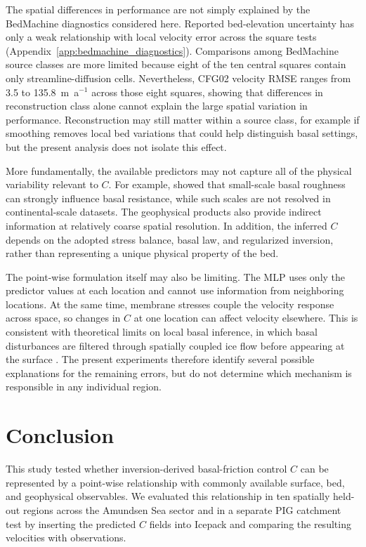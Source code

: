\documentclass[review,jog]{igs}
\begin{document}
The spatial differences in performance are not simply explained by the
BedMachine diagnostics considered here. Reported bed-elevation uncertainty has
only a weak relationship with local velocity error across the square tests
(Appendix~\ref{app:bedmachine_diagnostics}). Comparisons among BedMachine
source classes are more limited because eight of the ten central squares
contain only streamline-diffusion cells. Nevertheless, CFG02 velocity RMSE
ranges from 3.5 to 135.8~m~a$^{-1}$ across those eight squares, showing that
differences in reconstruction class alone cannot explain the large spatial
variation in performance. Reconstruction may still matter within a source
class, for example if smoothing removes local bed variations that could help
distinguish basal settings, but the present analysis does not isolate this
effect.

More fundamentally, the available predictors may not capture all of the
physical variability relevant to $C$. For example, \citet{hoffman2022impact}
showed that small-scale basal roughness can strongly influence basal
resistance, while such scales are not resolved in continental-scale datasets.
The geophysical products also provide indirect information at relatively
coarse spatial resolution. In addition, the inferred $C$ depends on the
adopted stress balance, basal law, and regularized inversion, rather than
representing a unique physical property of the bed.

The point-wise formulation itself may also be limiting. The MLP uses only the
predictor values at each location and cannot use information from neighboring
locations. At the same time, membrane stresses couple the velocity response
across space, so changes in $C$ at one location can affect velocity elsewhere.
This is consistent with theoretical limits on local basal inference, in which
basal disturbances are filtered through spatially coupled ice flow before
appearing at the surface
\citep{gudmundsson2003transmission,raymond2005relationship,
gudmundsson2008limit}. The present experiments therefore identify several
possible explanations for the remaining errors, but do not determine which
mechanism is responsible in any individual region.


\section{Conclusion}

This study tested whether inversion-derived basal-friction control $C$ can be represented by a point-wise relationship with commonly available surface, bed, and geophysical observables. We evaluated this relationship in ten spatially held-out regions across the Amundsen Sea sector and in a separate PIG catchment test by inserting the predicted $C$ fields into Icepack and comparing the resulting velocities with observations.
\end{document}
